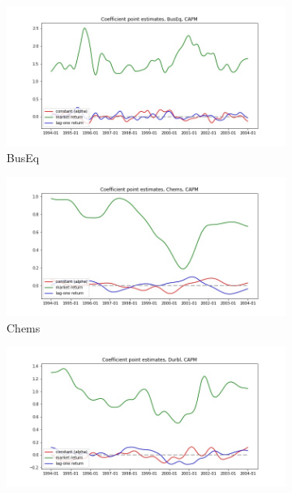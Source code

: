 \documentclass{article}
\begin{document}
\begin{figure}
  \begin{subfigure}[b]{0.5\textwidth}
    \centering
    \includegraphics[width=\textwidth]{BusEq/coeffs_CAPM.jpg}
    \caption{BusEq}
    \label{fig:1}
  \end{subfigure}
  \begin{subfigure}[b]{0.5\textwidth}
    \centering
    \includegraphics[width=\textwidth]{Chems/coeffs_CAPM.jpg}
    \caption{Chems}
    \label{fig:2}
  \end{subfigure}
  \begin{subfigure}[b]{0.5\textwidth}
    \centering
    \includegraphics[width=\textwidth]{Durbl/coeffs_CAPM.jpg}

\end{subfigure}
\end{figure}
\end{document}
